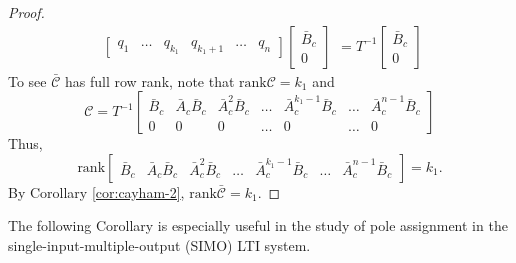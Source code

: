 \documentclass[
]{book}
\theoremstyle{definition}
\theoremstyle{definition}
\theoremstyle{definition}
\theoremstyle{definition}
\theoremstyle{remark}
\begin{document}
\begin{proof}
\begin{equation*}
\begin{split}
\begin{bmatrix}
         q_1 & \dots & q_{k_1} & q_{k_1+1} & \dots & q_{n} 
      \end{bmatrix} \begin{bmatrix}
         \bar{B}_c \\ 0
      \end{bmatrix}
   \end{split} = T^{-1} \begin{bmatrix}
      \bar{B}_c \\ 0
   \end{bmatrix}
\end{equation*}
To see \(\bar{\mathcal{C}}\) has full row rank, note that \(\text{rank} \mathcal{C} = k_1\) and
\begin{equation*}
   \mathcal{C} = T^{-1} \begin{bmatrix}
      \bar{B}_c & \bar{A}_c \bar{B}_c & \bar{A}_c^2 \bar{B}_c & \dots & \bar{A}_c^{k_1 - 1} \bar{B}_c & \dots & \bar{A}_c^{n - 1} \bar{B}_c \\
      0 & 0 & 0 & \dots & 0 & \dots & 0
   \end{bmatrix}
\end{equation*}
Thus,
\[\text{rank}\begin{bmatrix}
   \bar{B}_c & \bar{A}_c \bar{B}_c & \bar{A}_c^2 \bar{B}_c & \dots & \bar{A}_c^{k_1 - 1} \bar{B}_c & \dots & \bar{A}_c^{n - 1} \bar{B}_c
\end{bmatrix} = k_1.
\]
By Corollary \ref{cor:cayham-2}, \(\text{rank}\bar{\mathcal{C}} = k_1\).
\end{proof}

The following Corollary is especially useful in the study of pole assignment in the single-input-multiple-output (SIMO) LTI system.
\end{document}
